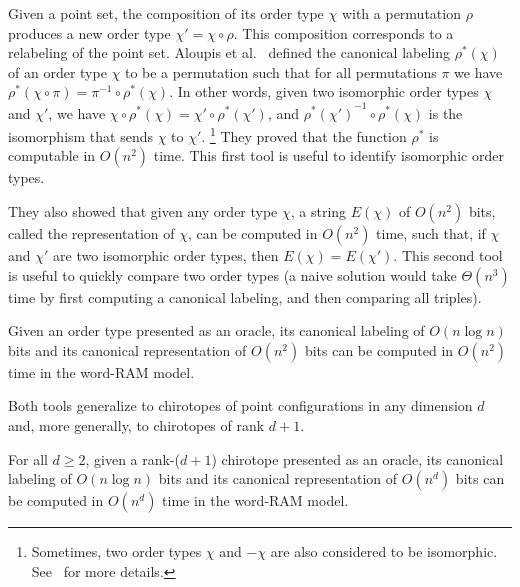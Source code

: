 
Given a point set, the composition of its order type \(\chi\) with a
permutation \(\rho\) produces a new order type \(\chi' = \chi \circ \rho\).
This composition corresponds to a relabeling of the point set.
%
Aloupis et al.~\cite{AILOW14} defined the canonical labeling \(\rho^*(\chi)\)
of an order type \(\chi\) to be a permutation such that for all permutations
\(\pi\) we have \(\rho^*(\chi \circ \pi) = \pi^{-1} \circ \rho^*(\chi)\).
In other words, given two isomorphic order types \(\chi\) and \(\chi'\), we
have \(\chi \circ \rho^*(\chi) = \chi' \circ \rho^*(\chi')\), and
\({\rho^*(\chi')}^{-1} \circ \rho^*(\chi)\) is the isomorphism that sends
\(\chi\) to \(\chi'\).%
\footnote{Sometimes, two order types \(\chi\) and \(- \chi\) are also considered
to be isomorphic. See~\cite{AILOW14} for more details.}
They proved that the function \(\rho^*\) is
computable in \(O(n^2)\) time.
%
This first tool is useful to identify isomorphic order types.

They also showed that given any order type \(\chi\), a string \(E(\chi)\) of
\(O(n^2)\) bits, called the representation of \(\chi\), can be computed in
\(O(n^2)\) time, such that, if \(\chi\) and \(\chi'\) are two isomorphic order
types, then \(E(\chi) = E(\chi')\).
%
This second tool is useful to quickly compare two order types (a naive solution
would take \(\Theta(n^3)\) time by first computing a canonical labeling, and
then comparing all triples).

\begin{lemma}\label{lem:canonical-labeling}
  Given an order type presented as an oracle,
  its canonical labeling of \(O(n \log n)\) bits
  and
  its canonical representation of \(O(n^2)\) bits
  can be computed in \(O(n^2)\) time
  in the word-RAM model.
\end{lemma}

Both tools generalize to chirotopes of point configurations in any dimension
\(d\) and, more generally, to chirotopes of rank \(d+1\).

\begin{lemma}\label{lem:canonical-labeling-d}
  For all \(d \geq 2\),
  given a rank-(\(d+1\)) chirotope presented as an oracle,
  its canonical labeling of \(O(n \log n)\) bits
  and
  its canonical representation of \(O(n^d)\) bits
  can be computed in \(O(n^d)\) time
  in the word-RAM model.
\end{lemma}

